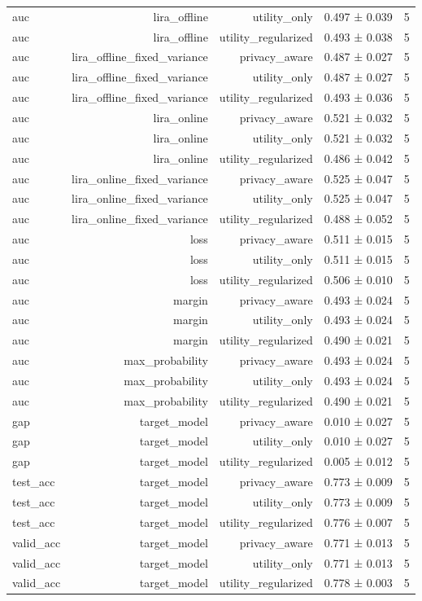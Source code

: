 \begin{table}
\begin{tabular}{lrrrr}
auc & lira\_offline & utility\_only & 0.497 ± 0.039 & 5 \\
auc & lira\_offline & utility\_regularized & 0.493 ± 0.038 & 5 \\
auc & lira\_offline\_fixed\_variance & privacy\_aware & 0.487 ± 0.027 & 5 \\
auc & lira\_offline\_fixed\_variance & utility\_only & 0.487 ± 0.027 & 5 \\
auc & lira\_offline\_fixed\_variance & utility\_regularized & 0.493 ± 0.036 & 5 \\
auc & lira\_online & privacy\_aware & 0.521 ± 0.032 & 5 \\
auc & lira\_online & utility\_only & 0.521 ± 0.032 & 5 \\
auc & lira\_online & utility\_regularized & 0.486 ± 0.042 & 5 \\
auc & lira\_online\_fixed\_variance & privacy\_aware & 0.525 ± 0.047 & 5 \\
auc & lira\_online\_fixed\_variance & utility\_only & 0.525 ± 0.047 & 5 \\
auc & lira\_online\_fixed\_variance & utility\_regularized & 0.488 ± 0.052 & 5 \\
auc & loss & privacy\_aware & 0.511 ± 0.015 & 5 \\
auc & loss & utility\_only & 0.511 ± 0.015 & 5 \\
auc & loss & utility\_regularized & 0.506 ± 0.010 & 5 \\
auc & margin & privacy\_aware & 0.493 ± 0.024 & 5 \\
auc & margin & utility\_only & 0.493 ± 0.024 & 5 \\
auc & margin & utility\_regularized & 0.490 ± 0.021 & 5 \\
auc & max\_probability & privacy\_aware & 0.493 ± 0.024 & 5 \\
auc & max\_probability & utility\_only & 0.493 ± 0.024 & 5 \\
auc & max\_probability & utility\_regularized & 0.490 ± 0.021 & 5 \\
gap & target\_model & privacy\_aware & 0.010 ± 0.027 & 5 \\
gap & target\_model & utility\_only & 0.010 ± 0.027 & 5 \\
gap & target\_model & utility\_regularized & 0.005 ± 0.012 & 5 \\
test\_acc & target\_model & privacy\_aware & 0.773 ± 0.009 & 5 \\
test\_acc & target\_model & utility\_only & 0.773 ± 0.009 & 5 \\
test\_acc & target\_model & utility\_regularized & 0.776 ± 0.007 & 5 \\
valid\_acc & target\_model & privacy\_aware & 0.771 ± 0.013 & 5 \\
valid\_acc & target\_model & utility\_only & 0.771 ± 0.013 & 5 \\
valid\_acc & target\_model & utility\_regularized & 0.778 ± 0.003 & 5 \\
\bottomrule
\end{tabular}
\end{table}


